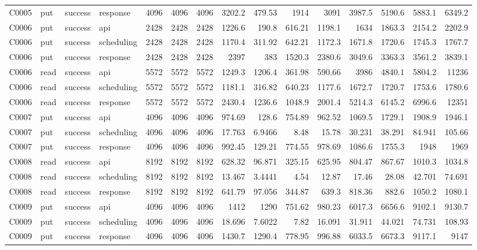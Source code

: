 \begin{landscape}
\begin{longtable}{llllrrrrrrrrrrr}
C0005 & put & success & response & 4096 & 4096 & 4096 & 3202.2 & 479.53 & 1914 & 3091 & 3987.5 & 5190.6 & 5883.1 & 6349.2\\
C0006 & put & success & api & 2428 & 2428 & 2428 & 1226.6 & 190.8 & 616.21 & 1198.1 & 1634 & 1863.3 & 2154.2 & 2202.9\\
C0006 & put & success & scheduling & 2428 & 2428 & 2428 & 1170.4 & 311.92 & 642.21 & 1172.3 & 1671.8 & 1720.6 & 1745.3 & 1767.7\\
C0006 & put & success & response & 2428 & 2428 & 2428 & 2397 & 383 & 1520.3 & 2380.6 & 3049.6 & 3363.3 & 3561.2 & 3839.1\\
C0006 & read & success & api & 5572 & 5572 & 5572 & 1249.3 & 1206.4 & 361.98 & 590.66 & 3986 & 4840.1 & 5804.2 & 11236\\
C0006 & read & success & scheduling & 5572 & 5572 & 5572 & 1181.1 & 316.82 & 640.23 & 1177.6 & 1672.7 & 1720.7 & 1753.6 & 1780.6\\
C0006 & read & success & response & 5572 & 5572 & 5572 & 2430.4 & 1236.6 & 1048.9 & 2001.4 & 5214.3 & 6145.2 & 6996.6 & 12351\\
C0007 & put & success & api & 4096 & 4096 & 4096 & 974.69 & 128.6 & 754.89 & 962.52 & 1069.5 & 1729.1 & 1908.9 & 1946.1\\
C0007 & put & success & scheduling & 4096 & 4096 & 4096 & 17.763 & 6.9466 & 8.48 & 15.78 & 30.231 & 38.291 & 84.941 & 105.66\\
C0007 & put & success & response & 4096 & 4096 & 4096 & 992.45 & 129.21 & 774.55 & 978.69 & 1086.6 & 1755.3 & 1948 & 1969\\
C0008 & read & success & api & 8192 & 8192 & 8192 & 628.32 & 96.871 & 325.15 & 625.95 & 804.47 & 867.67 & 1010.3 & 1034.8\\
C0008 & read & success & scheduling & 8192 & 8192 & 8192 & 13.467 & 3.4441 & 4.54 & 12.87 & 17.46 & 28.08 & 42.701 & 74.691\\
C0008 & read & success & response & 8192 & 8192 & 8192 & 641.79 & 97.056 & 344.87 & 639.3 & 818.36 & 882.6 & 1050.2 & 1080.1\\
C0009 & put & success & api & 4096 & 4096 & 4096 & 1412 & 1290 & 751.62 & 980.23 & 6017.3 & 6656.6 & 9102.1 & 9130.7\\
C0009 & put & success & scheduling & 4096 & 4096 & 4096 & 18.696 & 7.6022 & 7.82 & 16.091 & 31.911 & 44.021 & 74.731 & 108.93\\
C0009 & put & success & response & 4096 & 4096 & 4096 & 1430.7 & 1290.4 & 778.95 & 996.88 & 6033.5 & 6673.3 & 9117.1 & 9147\\

\end{longtable}
\end{landscape}
